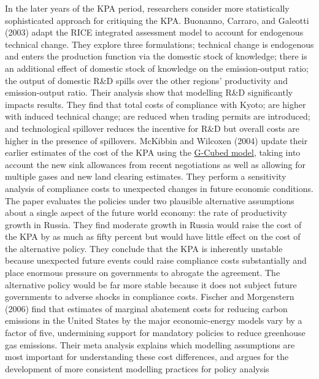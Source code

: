\documentclass[
  10pt,
]{article}
\begin{document}
In the later years of the KPA period, researchers consider more
statistically sophisticated approach for critiquing the KPA. Buonanno,
Carraro, and Galeotti (2003) adapt the RICE integrated assessment model
to account for endogenous technical change. They explore three
formulations; technical change is endogenous and enters the production
function via the domestic stock of knowledge; there is an additional
effect of domestic stock of knowledge on the emission-output ratio; the
output of domestic R\&D spills over the other regions' productivity and
emission-output ratio. Their analysis show that modelling R\&D
significantly impacts results. They find that total costs of compliance
with Kyoto; are higher with induced technical change; are reduced when
trading permits are introduced; and technological spillover reduces the
incentive for R\&D but overall costs are higher in the presence of
spillovers. McKibbin and Wilcoxen (2004) update their earlier estimates
of the cost of the KPA using the
\href{https://unfccc.int/topics/mitigation/workstreams/response-measures/modelling-tools-to-assess-the-impact-of-the-implementation-of-response-measures/response-measures-models-g-cubed}{G-Cubed
model}, taking into account the new sink allowances from recent
negotiations as well as allowing for multiple gases and new land
clearing estimates. They perform a sensitivity analysis of compliance
costs to unexpected changes in future economic conditions. The paper
evaluates the policies under two plausible alternative assumptions about
a single aspect of the future world economy: the rate of productivity
growth in Russia. They find moderate growth in Russia would raise the
cost of the KPA by as much as fifty percent but would have little effect
on the cost of the alternative policy. They conclude that the KPA is
inherently unstable because unexpected future events could raise
compliance costs substantially and place enormous pressure on
governments to abrogate the agreement. The alternative policy would be
far more stable because it does not subject future governments to
adverse shocks in compliance costs. Fischer and Morgenstern (2006) find
that estimates of marginal abatement costs for reducing carbon emissions
in the United States by the major economic-energy models vary by a
factor of five, undermining support for mandatory policies to reduce
greenhouse gas emissions. Their meta analysis explains which modelling
assumptions are most important for understanding these cost differences,
and argues for the development of more consistent modelling practices
for policy analysis
\end{document}

